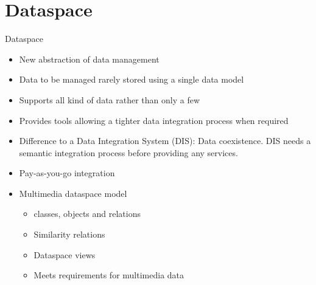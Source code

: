 \section{Dataspace}
\begin{frame}{Dataspace}
\begin{itemize}
    \item New abstraction of data management \cite{Franklin:2005:DDN:1107499.1107502}
    \item Data to be managed rarely stored using a single data model
    \item Supports all kind of data rather than only a few
    \item Provides tools allowing a tighter data integration process when required
    \item Difference to a Data Integration System (DIS): Data coexistence. DIS needs a semantic integration process before providing any services.
    \item Pay-as-you-go integration
    \item Multimedia dataspace model\cite{6167826}
    \begin{itemize}
    	\item classes, objects and relations
    	\item Similarity relations
    	\item Dataspace views
    	\item Meets requirements for multimedia data
    \end{itemize}
\end{itemize}
\end{frame}



